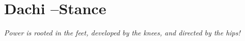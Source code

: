 \documentclass[11pt]{article}
\begin{document}

\newenvironment{parallelNB}[1][2] %
 {
  \setlength{\columnseprule}{0pt}
  \begin{minipage}[t]{\linewidth} %
  \begin{multicols}{#1}  %
 }
 { 
  \end{multicols}
  \end{minipage}
 }

\newenvironment{parallel3NB}
 {
  \setlength{\columnseprule}{0pt}
  \begin{minipage}[t]{\linewidth} %
  \begin{multicols}{3}
 }
 { 
  \end{multicols}
  \end{minipage}
 }

\def\providedS{ \qquad\Leftarrow\qquad }

\def\impliesS{ \qquad\Rightarrow\qquad }

\def\landS{ \qquad\land\qquad }
\def\lands{ \quad\land\quad }

\def\eqs{ \quad=\quad}

\def\equivs{ \quad\equiv\quad}
\def\equivS{ \qquad\equiv\qquad}

\def\begineqns{ \begingroup\setlength{\abovedisplayskip}{-1pt}\setlength{\belowdisplayskip}{-1pt} }
\def\endeqns{ \endgroup }

\def\room{\vspace{0.5em}}

\setlength{\abovedisplayskip}{5pt} \setlength{\belowdisplayskip}{2pt}
\def\eqn#1#2{ \begin{flalign*} #2 && \tag*{\sc #1} \label{#1} \end{flalign*}  }



\def\invisibleHI{ \invisible{Hi} }
\def\invisible#1{ {\color{white}{#1}}  }

\def\forcenewline{ {\color{white} .} \newline }
\def\forcenewpage{ {\color{white} .} \newpage }

\section{Dachi --Stance}
\label{sec:orge339ad6}
\begin{center}
\emph{Power is rooted in the feet, developed by the knees, and directed by the hips!}
\end{center}
\end{document}

